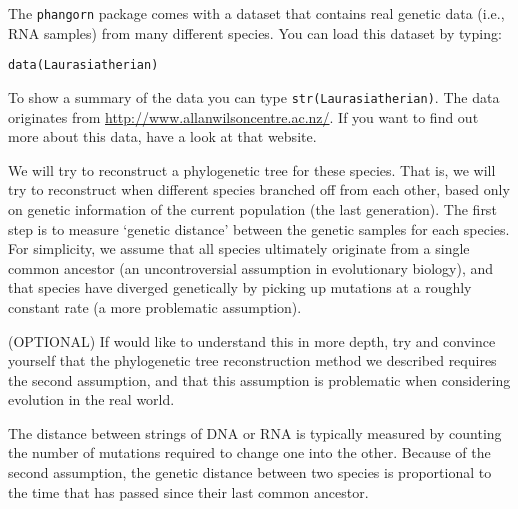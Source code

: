 \documentclass[a4paper, 9pt]{article}
\begin{document}
The \texttt{phangorn} package comes with a dataset that contains real
genetic data (i.e., RNA samples) from many different species. You can
load this dataset by typing:

\begin{lstlisting}
data(Laurasiatherian)
\end{lstlisting}

To show a summary of the data you can type
\texttt{str(Laurasiatherian)}. The data originates from
\url{http://www.allanwilsoncentre.ac.nz/}. If you want to find out more
about this data, have a look at that website.

We will try to reconstruct a phylogenetic tree for these species. That
is, we will try to reconstruct when different species branched off from
each other, based only on genetic information of the current population
(the last generation). The first step is to measure `genetic distance'
between the genetic samples for each species. For simplicity, we assume
that all species ultimately originate from a single common ancestor (an
uncontroversial assumption in evolutionary biology), and that species
have diverged genetically by picking up mutations at a roughly constant
rate (a more problematic assumption).

\begin{exercise}
\ask (OPTIONAL) If would like to understand this in more depth, try and convince yourself that the phylogenetic tree reconstruction method we described requires the second assumption, and that this assumption is problematic when considering evolution in the real world.
\end{exercise}

The distance between strings of DNA or RNA is typically measured by
counting the number of mutations required to change one into the other.
Because of the second assumption, the genetic distance between two
species is proportional to the time that has passed since their last
common ancestor.
\end{document}
